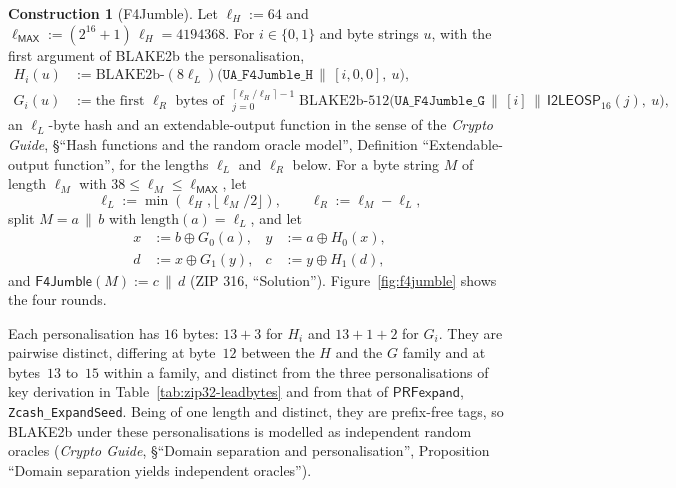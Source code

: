 \documentclass[11pt,a4paper]{article}
\theoremstyle{definition}
\newtheorem{construction}[theorem]{Construction}
\begin{document}
\begin{construction}[F4Jumble]\label{def:addr-f4jumble}
Let $\ell_H := 64$ and $\ell_{\mathsf{MAX}} := (2^{16} + 1)\,\ell_H =
4194368$. For $i \in \{0, 1\}$ and byte strings $u$, with the first argument
of BLAKE2b the personalisation,
\begin{align*}
  H_i(u) &:= \mathrm{BLAKE2b\text{-}}(8\ell_L)\bigl(
    \texttt{UA\_F4Jumble\_H} \,\|\, [i, 0, 0],\ u\bigr), \\
  G_i(u) &:= \text{the first } \ell_R \text{ bytes of }
    \mathop{\big\|}_{j=0}^{\lceil \ell_R / \ell_H \rceil - 1}
    \mathrm{BLAKE2b\text{-}512}\bigl(\texttt{UA\_F4Jumble\_G} \,\|\, [i]
    \,\|\, \mathsf{I2LEOSP}_{16}(j),\ u\bigr),
\end{align*}
an $\ell_L$-byte hash and an extendable-output function in the sense of the
\emph{Crypto Guide}, \S``Hash functions and the random oracle model'',
Definition ``Extendable-output function'', for the lengths $\ell_L$ and
$\ell_R$ below. For a byte string $M$ of length $\ell_M$ with
$38 \le \ell_M \le \ell_{\mathsf{MAX}}$, let
\[
  \ell_L := \min(\ell_H, \lfloor \ell_M / 2 \rfloor), \qquad
  \ell_R := \ell_M - \ell_L,
\]
split $M = a \,\|\, b$ with $\mathrm{length}(a) = \ell_L$, and let
\begin{align*}
  x &:= b \oplus G_0(a), & y &:= a \oplus H_0(x), \\
  d &:= x \oplus G_1(y), & c &:= y \oplus H_1(d),
\end{align*}
and $\mathsf{F4Jumble}(M) := c \,\|\, d$ (ZIP 316, ``Solution'').
Figure~\ref{fig:f4jumble} shows the four rounds.
\end{construction}

Each personalisation has $16$ bytes: $13 + 3$ for $H_i$ and $13 + 1 + 2$ for
$G_i$. They are pairwise distinct, differing at byte~$12$ between the $H$
and the $G$ family and at bytes~$13$ to~$15$ within a family, and distinct
from the three personalisations of key derivation in
Table~\ref{tab:zip32-leadbytes} and from that of $\mathsf{PRFexpand}$,
\texttt{Zcash\_ExpandSeed}. Being of one length and distinct, they are
prefix-free tags, so BLAKE2b under these personalisations is modelled as
independent random oracles (\emph{Crypto Guide}, \S``Domain separation and
personalisation'', Proposition ``Domain separation yields independent
oracles'').
\end{document}
